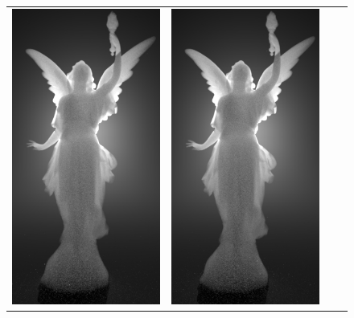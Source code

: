 \begin{figure}
\begin{tabular}{cc|cc}
        \includegraphics[width=\resLen]{images/lucy/neg_unc.jpg} &
        \includegraphics[width=\resLen]{images/lucy/neg_neg.jpg} &

\end{tabular}
\end{figure}
